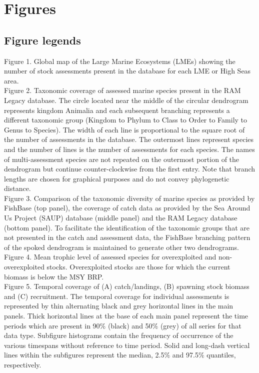 \section*{Figures}
\subsection*{Figure legends}

\noindent Figure 1. Global map of the Large Marine Ecosystems (LMEs) showing the
number of stock assessments present in the database for each LME or High Seas area. \\ 

\noindent Figure 2. Taxonomic coverage of assessed marine species present in the
RAM Legacy database. The circle located near the middle of the circular
dendrogram represents kingdom Animalia and each subsequent branching
represents a different taxonomic group (Kingdom to Phylum to Class to
Order to Family to Genus to Species). The width of each line is
proportional to the square root of the number of assessments in the
database. The outermost lines represent species and the number of
lines is the number of assessments for each species. The names of
multi-assessment species are not repeated on the outermost portion of
the dendrogram but continue counter-clockwise from the first entry.
Note that branch lengths are chosen for graphical purposes and do not
convey phylogenetic distance.\\ 

\noindent Figure 3. Comparison of the taxonomic diversity of marine
species as provided by FishBase (top panel), the coverage of catch
data as provided by the Sea Around Us Project (SAUP) database (middle
panel) and the RAM Legacy database (bottom panel). To facilitate the
identification of the taxonomic groups that are not presented in the catch
and assessment data, the FishBase branching pattern of the spoked dendrogram is
maintained to generate other two dendrograms.\\ 

\noindent Figure 4. Mean trophic level of assessed species for
overexploited and non-overexploited stocks. Overexploited stocks are
those for which the current biomass is below the MSY BRP. \\ 

\noindent Figure 5. Temporal coverage of (A) catch/landings, (B) spawning stock
biomass and (C) recruitment. The temporal coverage for individual
assessments is represented by thin alternating black and grey
horizontal lines in the main panels. Thick horizontal lines at the
base of each main panel represent the time periods which are present
in 90\% (black) and 50\% (grey) of all series for that data type.
Subfigure histograms contain the frequency of occurrence of the
various timespans without reference to time period. Solid and
long-dash vertical lines within the subfigures represent the median,
2.5\% and 97.5\% quantiles, respectively.\\ 

